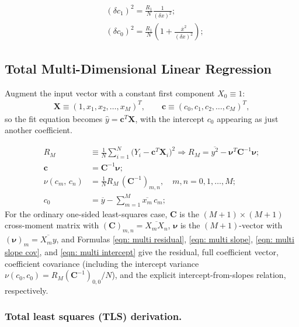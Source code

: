 \documentclass[twoside]{article}
\numberwithin{equation}{section}
\begin{document}
\begin{align}
\label{eqn: set slope variance}
&(\delta c_1)^2 = \frac{R_1}{N} \frac{1}{(\delta x)^2}; \\
\label{eqn: set intercept variance}
&(\delta c_0)^2 = \frac{R_1}{N} \left( 1 + \frac{\overline{x}^2}{(\delta x)^2} \right);
\end{align}


\subsection{Total Multi-Dimensional Linear Regression}

Augment the input vector with a constant first component $X_0 \equiv 1$:
\begin{align*}
\mathbf{X} \equiv (1, x_1, x_2, \dots, x_M)^T,
\qquad
\mathbf{c} \equiv (c_0, c_1, c_2, \dots, c_M)^T,
\end{align*}
so the fit equation becomes $\hat{y} = \mathbf{c}^T \mathbf{X}$, with the intercept $c_0$ appearing as just another coefficient.

\begin{align}
\label{eqn: multi residual}
R_M &\equiv \frac{1}{N} \sum_{i=1}^N \bigl( Y_i - \mathbf{c}^T \mathbf{X}_i \bigr)^2
		\Rightarrow R_M = \overline{y^2} - \boldsymbol{\nu}^T \mathbf{C}^{-1} \boldsymbol{\nu}; \\
\label{eqn: multi slope}
\mathbf{c} &= \mathbf{C}^{-1} \boldsymbol{\nu}; \\
\label{eqn: multi slope cov}
\nu(c_m,\, c_n) &= \frac{1}{N} R_M\, (\mathbf{C}^{-1})_{m,n}, \quad m, n = 0, 1, \dots, M; \\
\label{eqn: multi intercept}
c_0 &= \overline{y} - \sum_{m=1}^{M} \overline{x_m}\, c_m;
\end{align}
For the ordinary one-sided least-squares case, $\mathbf{C}$ is the $(M+1) \times (M+1)$ cross-moment matrix with $(\mathbf{C})_{m,n} = \overline{X_m X_n}$, $\boldsymbol{\nu}$ is the $(M+1)$-vector with $(\boldsymbol{\nu})_m = \overline{X_m y}$, and Formulas \eqref{eqn: multi residual}, \eqref{eqn: multi slope}, \eqref{eqn: multi slope cov}, and \eqref{eqn: multi intercept} give the residual, full coefficient vector, coefficient covariance (including the intercept variance $\nu(c_0, c_0) = R_M (\mathbf{C}^{-1})_{0,0}/N$), and the explicit intercept-from-slopes relation, respectively.

\subsubsection{Total least squares (TLS) derivation.}
\end{document}
